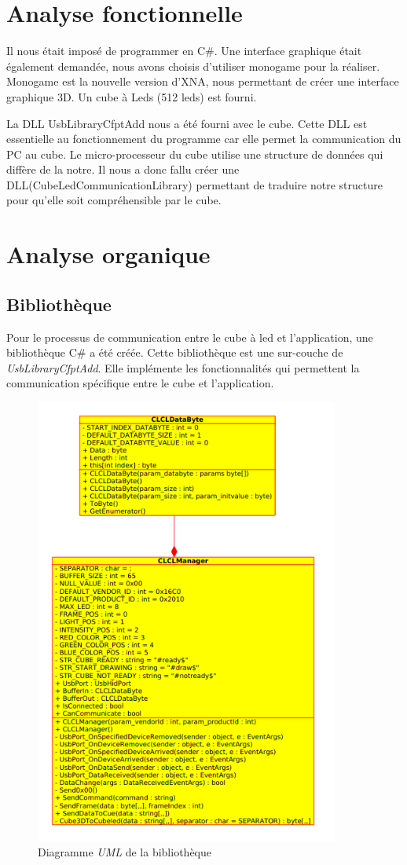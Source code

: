 \documentclass[a4paper,12pt]{article}
\begin{document}
\newpage
\section{Analyse fonctionnelle}
\noindent Il nous était imposé de programmer en C\#. Une interface graphique était également demandée, nous avons choisis d'utiliser monogame pour la réaliser. Monogame est la nouvelle version d'XNA, nous permettant de créer une interface graphique 3D. Un cube à Leds (512 leds) est fourni. 
\vspace{1cm}

\noindent La DLL UsbLibraryCfptAdd nous a été fourni avec le cube. Cette DLL est essentielle au fonctionnement du programme car elle permet la communication du PC au cube. Le micro-processeur du cube utilise une structure de données qui diffère de la notre. Il nous a donc fallu créer une DLL(CubeLedCommunicationLibrary) permettant de traduire notre structure pour qu'elle soit compréhensible par le cube.
\newpage

\section{Analyse organique}
\subsection{Bibliothèque \clcl}
Pour le processus de communication entre le cube à led et l'application, une bibliothèque C\# a été créée. Cette bibliothèque est une sur-couche de \emph{UsbLibraryCfptAdd}. Elle implémente les fonctionnalités qui permettent la communication spécifique entre le cube et l'application.
\begin{figure}[htp]
	\centering
	\includegraphics[width=10cm]{Img/uml_clcl.png}
	\caption{Diagramme \emph{UML} de la bibliothèque \clcl}
	\label{uml_clcl}
\end{figure}
\end{document}
